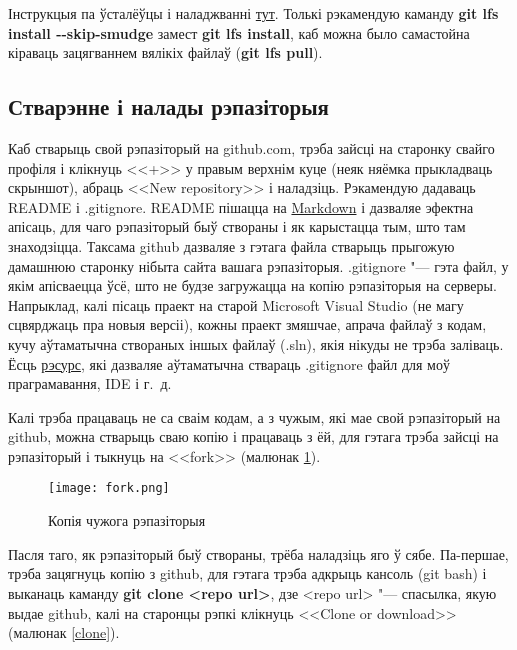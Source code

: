 \documentclass[12pt, a4paper]{extarticle}
\begin{document}
    Інструкцыя па ўсталёўцы і наладжванні \href{https://github.com/git-lfs/git-lfs}{тут}. Толькі рэкамендую каманду \textbf{git lfs install -\hspace{1pt}-skip-smudge} замест \textbf{git lfs install}, каб можна было самастойна кіраваць зацягваннем вялікіх файлаў (\textbf{git lfs pull}). 

    \subsection{Стварэнне і налады рэпазіторыя}
    Каб стварыць свой рэпазіторый на github.com, трэба зайсці на старонку свайго профіля і клікнуць <<+>> у правым верхнім куце (неяк няёмка прыкладваць скрыншот), абраць <<New repository>> і наладзіць. Рэкамендую дадаваць README і .gitignore. README пішацца на \href{https://en.wikipedia.org/wiki/Markdown}{Markdown} і дазваляе эфектна апісаць, для чаго рэпазіторый быў створаны і як карыстацца тым, што там знаходзіцца. Таксама github дазваляе з гэтага файла стварыць прыгожую дамашнюю старонку нібыта сайта вашага рэпазіторыя. .gitignore "--- гэта файл, у якім апісваецца ўсё, што не будзе загружацца на копію рэпазіторыя на серверы. Напрыклад, калі пісаць праект на старой Microsoft Visual Studio (не магу сцвярджаць пра новыя версіі), кожны праект змяшчае, апрача файлаў з кодам, кучу аўтаматычна створаных іншых файлаў (.sln), якія нікуды не трэба заліваць. Ёсць \href{https://www.gitignore.io}{рэсурс}, які дазваляе аўтаматычна ствараць .gitignore файл для моў праграмавання, IDE і г.~д.

    Калі трэба працаваць не са сваім кодам, а з чужым, які мае свой рэпазіторый на github, можна стварыць сваю копію і працаваць з ёй, для гэтага трэба зайсці на рэпазіторый і тыкнуць на <<fork>> (малюнак \ref{fork}).

    \begin{figure}[H]
        \begin{center}
            \texttt{[image: fork.png]}
        \end{center}
        \caption{Копія чужога рэпазіторыя} \label{fork}
    \end{figure}

    Пасля таго, як рэпазіторый быў створаны, трёба наладзіць яго ў сябе. Па-першае, трэба зацягнуць копію з github, для гэтага трэба адкрыць кансоль (git bash) і выканаць каманду \textbf{git clone <repo url>}, дзе <repo url> "--- спасылка, якую выдае github, калі на старонцы рэпкі клікнуць <<Clone or download>> (малюнак \ref{clone}).
\end{document}
